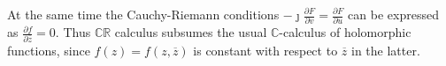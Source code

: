 \documentclass[a4paper,10pt,twocolumn]{article}
\newcommand{\real}{\mathbb{R}}
\newcommand{\cplx}{\mathbb{C}}
\newcommand{\iu}{{\jmath}}
\newcommand{\conj}[1]{\overline{#1}}
\begin{document}
At the same time the Cauchy-Riemann conditions $
  -\iu \tfrac{\partial F}{\partial v} = \tfrac{\partial F}{\partial u}
$ can be expressed as $
  \tfrac{\partial f}{\partial \conj{z}} = 0
$. Thus $\cplx\real$ calculus subsumes the usual $\cplx$-calculus of holomorphic functions,
since $f(z) = f(z, \conj{z})$ is constant with respect to $\conj{z}$ in the latter. 
\end{document}
